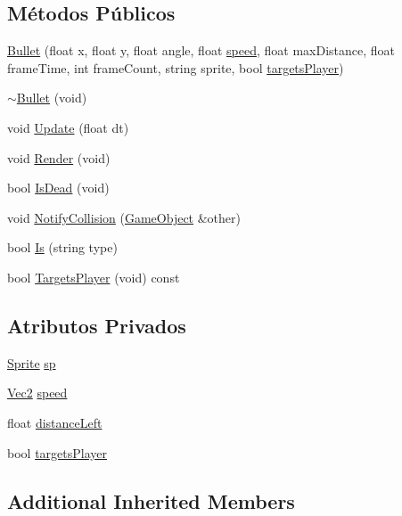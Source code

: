 \subsection*{Métodos Públicos}
\begin{DoxyCompactItemize}
\item 
\hyperlink{classBullet_a509f1d8e6f7629934574c15c835de0c8}{Bullet} (float x, float y, float angle, float \hyperlink{classBullet_a9674d36173dafc258455bbaa9b39b326}{speed}, float max\+Distance, float frame\+Time, int frame\+Count, string sprite, bool \hyperlink{classBullet_a57270bc61a381861bd548a7f2466bca2}{targets\+Player})
\item 
\hyperlink{classBullet_ab3c2b9c0b12c18aeace52bd289ddfce3}{$\sim$\+Bullet} (void)
\item 
void \hyperlink{classBullet_a5ca74d7990f25c518df1860b681079ea}{Update} (float dt)
\item 
void \hyperlink{classBullet_aace1e49986271afb6384d15bf40a0e92}{Render} (void)
\item 
bool \hyperlink{classBullet_a17cf15fdfa0c42931f21828feed2a77d}{Is\+Dead} (void)
\item 
void \hyperlink{classBullet_a272c1b019f46df9ad9bd45bd9ffb6e41}{Notify\+Collision} (\hyperlink{classGameObject}{Game\+Object} \&other)
\item 
bool \hyperlink{classBullet_aaa159cc9dcc3e7c780bbccc1ebc6d95a}{Is} (string type)
\item 
bool \hyperlink{classBullet_a293a665825d9e32c798d8fe669fcf695}{Targets\+Player} (void) const 
\end{DoxyCompactItemize}
\subsection*{Atributos Privados}
\begin{DoxyCompactItemize}
\item 
\hyperlink{classSprite}{Sprite} \hyperlink{classBullet_a3b796813022508f0f5f821c2a90ac863}{sp}
\item 
\hyperlink{classVec2}{Vec2} \hyperlink{classBullet_a9674d36173dafc258455bbaa9b39b326}{speed}
\item 
float \hyperlink{classBullet_ac24a38eea713d69e34c090416177b426}{distance\+Left}
\item 
bool \hyperlink{classBullet_a57270bc61a381861bd548a7f2466bca2}{targets\+Player}
\end{DoxyCompactItemize}
\subsection*{Additional Inherited Members}


